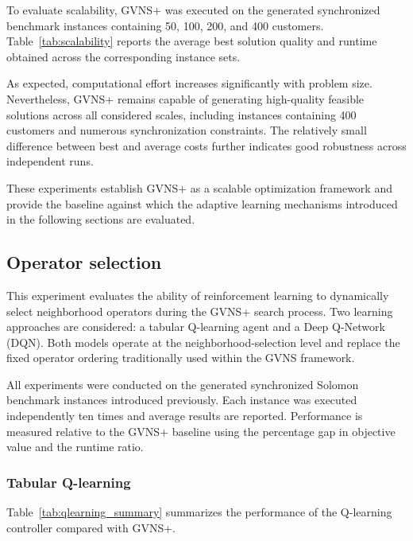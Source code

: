 To evaluate scalability, GVNS+ was executed on the generated synchronized benchmark instances containing 50, 100, 200, and 400 customers. Table~\ref{tab:scalability} reports the average best solution quality and runtime obtained across the corresponding instance sets.



As expected, computational effort increases significantly with problem size. Nevertheless, GVNS+ remains capable of generating high-quality feasible solutions across all considered scales, including instances containing 400 customers and numerous synchronization constraints. The relatively small difference between best and average costs further indicates good robustness across independent runs.

These experiments establish GVNS+ as a scalable optimization framework and provide the baseline against which the adaptive learning mechanisms introduced in the following sections are evaluated.

\subsection{Operator selection}
\label{sec:operator_selection}

This experiment evaluates the ability of reinforcement learning to dynamically select neighborhood operators during the GVNS+ search process. Two learning approaches are considered: a tabular Q-learning agent and a Deep Q-Network (DQN). Both models operate at the neighborhood-selection level and replace the fixed operator ordering traditionally used within the GVNS framework.

All experiments were conducted on the generated synchronized Solomon benchmark instances introduced previously. Each instance was executed independently ten times and average results are reported. Performance is measured relative to the GVNS+ baseline using the percentage gap in objective value and the runtime ratio.

\subsubsection{Tabular Q-learning}
Table~\ref{tab:qlearning_summary} summarizes the performance of the Q-learning controller compared with GVNS+.



